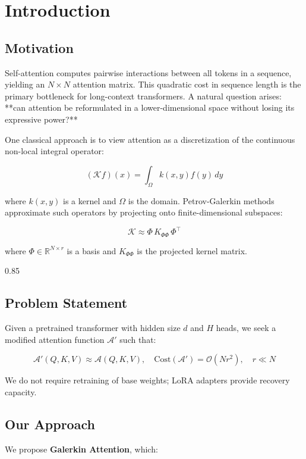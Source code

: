 
\section{Introduction}

\subsection{Motivation}

Self-attention computes pairwise interactions between all tokens in a 
sequence, yielding an $N \times N$ attention matrix. This quadratic cost 
in sequence length is the primary bottleneck for long-context transformers. 
A natural question arises: **can attention be reformulated in a lower-dimensional 
space without losing its expressive power?**

One classical approach is to view attention as a discretization of the 
continuous non-local integral operator:

\[
(\mathcal{K} f)(x) = \int_\Omega k(x, y) f(y) \, dy
\]

where $k(x, y)$ is a kernel and $\Omega$ is the domain. Petrov-Galerkin 
methods approximate such operators by projecting onto finite-dimensional 
subspaces:

\[
\mathcal{K} \approx \Phi \, K_{\Phi \Phi} \, \Phi^\top
\]

where $\Phi \in \mathbb{R}^{N \times r}$ is a basis and $K_{\Phi \Phi}$ is 
the projected kernel matrix.

0.85


\subsection{Problem Statement}

Given a pretrained transformer with hidden size $d$ and $H$ heads, we seek 
a modified attention function $\mathcal{A}'$ such that:

\[
\mathcal{A}'(Q, K, V) \approx \mathcal{A}(Q, K, V), \quad
\text{Cost}(\mathcal{A}') = \mathcal{O}(Nr^2), \quad r \ll N
\]

We do not require retraining of base weights; LoRA adapters provide 
recovery capacity.

\subsection{Our Approach}

We propose \textbf{Galerkin Attention}, which:

